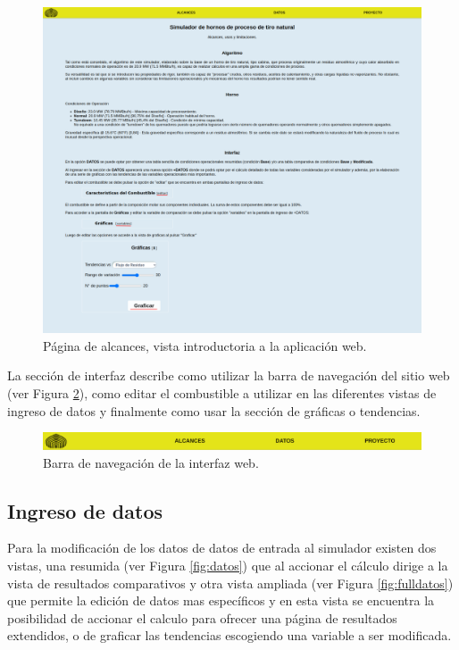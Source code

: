 \begin{figure}[hbt]
\begin{center}
\includegraphics[scale=0.2]{images/alcance}
\caption[Página de alcances]{Página de alcances, vista introductoria a la aplicación web.}
\label{fig:alcance}
\end{center}
\end{figure}

\par La sección de interfaz describe como utilizar la barra de navegación del sitio web (ver Figura \ref{fig:navbar}), como editar el combustible a utilizar en las diferentes vistas de ingreso de datos y finalmente como usar la sección de gráficas o tendencias.

\begin{figure}[hbt]
\begin{center}
\includegraphics[scale=0.2]{images/navbar}
\caption[Barra de navegación]{Barra de navegación de la interfaz web.}
\label{fig:navbar}
\end{center}
\end{figure}

\subsection{Ingreso de datos}

\par Para la modificación de los datos de datos de entrada al simulador existen dos vistas, una resumida (ver Figura \ref{fig:datos}) que al accionar el cálculo dirige a la vista de resultados comparativos y otra vista ampliada (ver Figura \ref{fig:fulldatos}) que permite la edición de datos mas específicos y en esta vista se encuentra la posibilidad de accionar el calculo para ofrecer una página de resultados extendidos, o de graficar las tendencias escogiendo una variable a ser modificada.

